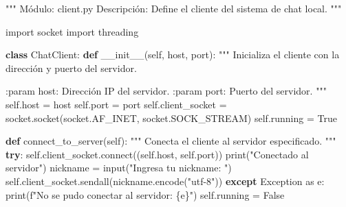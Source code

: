 \documentclass[
  a4paper,
  DIV=11,
  numbers=noendperiod,
  onepage,
  openany]{scrreprt}
\newenvironment{Shaded}{\begin{snugshade}}{\end{snugshade}}
\newcommand{\BuiltInTok}[1]{\textcolor[rgb]{0.00,0.23,0.31}{#1}}
\newcommand{\CommentTok}[1]{\textcolor[rgb]{0.37,0.37,0.37}{#1}}
\newcommand{\ControlFlowTok}[1]{\textcolor[rgb]{0.00,0.23,0.31}{\textbf{#1}}}
\newcommand{\ExtensionTok}[1]{\textcolor[rgb]{0.00,0.23,0.31}{#1}}
\newcommand{\FunctionTok}[1]{\textcolor[rgb]{0.28,0.35,0.67}{#1}}
\newcommand{\ImportTok}[1]{\textcolor[rgb]{0.00,0.46,0.62}{#1}}
\newcommand{\KeywordTok}[1]{\textcolor[rgb]{0.00,0.23,0.31}{\textbf{#1}}}
\newcommand{\NormalTok}[1]{\textcolor[rgb]{0.00,0.23,0.31}{#1}}
\newcommand{\OperatorTok}[1]{\textcolor[rgb]{0.37,0.37,0.37}{#1}}
\newcommand{\PreprocessorTok}[1]{\textcolor[rgb]{0.68,0.00,0.00}{#1}}
\newcommand{\SpecialCharTok}[1]{\textcolor[rgb]{0.37,0.37,0.37}{#1}}
\newcommand{\SpecialStringTok}[1]{\textcolor[rgb]{0.13,0.47,0.30}{#1}}
\newcommand{\StringTok}[1]{\textcolor[rgb]{0.13,0.47,0.30}{#1}}
\newcommand{\VariableTok}[1]{\textcolor[rgb]{0.07,0.07,0.07}{#1}}
\begin{document}
\begin{Shaded}
\begin{Highlighting}[]
\CommentTok{"""}
\CommentTok{Módulo: client.py}
\CommentTok{Descripción: Define el cliente del sistema de chat local.}
\CommentTok{"""}

\ImportTok{import}\NormalTok{ socket}
\ImportTok{import}\NormalTok{ threading}


\KeywordTok{class}\NormalTok{ ChatClient:}
    \KeywordTok{def} \FunctionTok{\_\_init\_\_}\NormalTok{(}\VariableTok{self}\NormalTok{, host, port):}
        \CommentTok{"""}
\CommentTok{        Inicializa el cliente con la dirección y puerto del servidor.}

\CommentTok{        :param host: Dirección IP del servidor.}
\CommentTok{        :param port: Puerto del servidor.}
\CommentTok{        """}
        \VariableTok{self}\NormalTok{.host }\OperatorTok{=}\NormalTok{ host}
        \VariableTok{self}\NormalTok{.port }\OperatorTok{=}\NormalTok{ port}
        \VariableTok{self}\NormalTok{.client\_socket }\OperatorTok{=}\NormalTok{ socket.socket(socket.AF\_INET, socket.SOCK\_STREAM)}
        \VariableTok{self}\NormalTok{.running }\OperatorTok{=} \VariableTok{True}

    \KeywordTok{def}\NormalTok{ connect\_to\_server(}\VariableTok{self}\NormalTok{):}
        \CommentTok{"""}
\CommentTok{        Conecta el cliente al servidor especificado.}
\CommentTok{        """}
        \ControlFlowTok{try}\NormalTok{:}
            \VariableTok{self}\NormalTok{.client\_socket.}\ExtensionTok{connect}\NormalTok{((}\VariableTok{self}\NormalTok{.host, }\VariableTok{self}\NormalTok{.port))}
            \BuiltInTok{print}\NormalTok{(}\StringTok{"Conectado al servidor"}\NormalTok{)}
\NormalTok{            nickname }\OperatorTok{=} \BuiltInTok{input}\NormalTok{(}\StringTok{"Ingresa tu nickname: "}\NormalTok{)}
            \VariableTok{self}\NormalTok{.client\_socket.sendall(nickname.encode(}\StringTok{"utf{-}8"}\NormalTok{))}
        \ControlFlowTok{except} \PreprocessorTok{Exception} \ImportTok{as}\NormalTok{ e:}
            \BuiltInTok{print}\NormalTok{(}\SpecialStringTok{f"No se pudo conectar al servidor: }\SpecialCharTok{\{}\NormalTok{e}\SpecialCharTok{\}}\SpecialStringTok{"}\NormalTok{)}
            \VariableTok{self}\NormalTok{.running }\OperatorTok{=} \VariableTok{False}


\end{Highlighting}
\end{Shaded}
\end{document}
